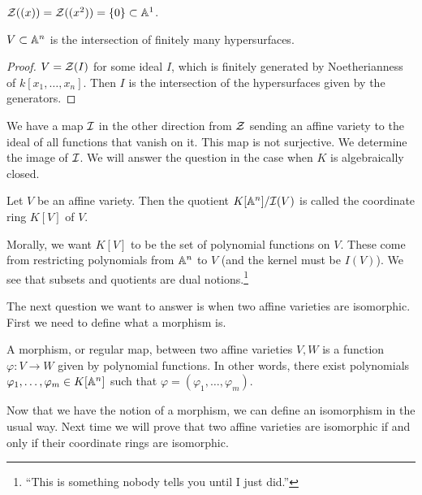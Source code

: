 \documentclass[10pt, twoside]{article}
\begin{document}
        \begin{exm}
            $\mathcal{Z}((x)) = \mathcal{Z}((x^2)) = \{0\} \subset \mathbb{A}^1$.
        \end{exm}

        \begin{prop}
            $V \subset \mathbb{A}^n$ is the intersection of finitely many hypersurfaces.
            \begin{proof}
                $V = \mathcal{Z}(I)$ for some ideal $I$, which is finitely generated by Noetherianness of $k[x_1, \ldots, x_n]$. Then $I$ is the intersection of the hypersurfaces given by the generators.
            \end{proof}
        \end{prop}

        We have a map $\mathcal{I}$ in the other direction from $\mathcal{Z}$ sending an affine variety to the ideal of all functions that vanish on it. This map is not surjective. We determine the image of $\mathcal{I}$. We will answer the question in the case when $K$ is algebraically closed.

        \begin{defn}
            Let $V$ be an affine variety. Then the quotient $K[\mathbb{A}^n]/\mathcal{I}(V)$ is called the coordinate ring $K[V]$ of $V$.
        \end{defn}

        Morally, we want $K[V]$ to be the set of polynomial functions on $V$. These come from restricting polynomials from $\mathbb{A}^n$ to $V$ (and the kernel must be $I(V)$). We see that subsets and quotients are dual notions.\footnote{``This is something nobody tells you until I just did.''}

        The next question we want to answer is when two affine varieties are isomorphic. First we need to define what a morphism is.

        \begin{defn}
            A morphism, or regular map, between two affine varieties $V,W$ is a function $\varphi:V \to W$ given by polynomial functions. In other words, there exist polynomials $\varphi_1, \ldots, \varphi_m \in K[\mathbb{A}^n]$ such that $\varphi = (\varphi_1, \ldots, \varphi_m)$.
        \end{defn}

        Now that we have the notion of a morphism, we can define an isomorphism in the usual way. Next time we will prove that two affine varieties are isomorphic if and only if their coordinate rings are isomorphic.
        
\end{document}
